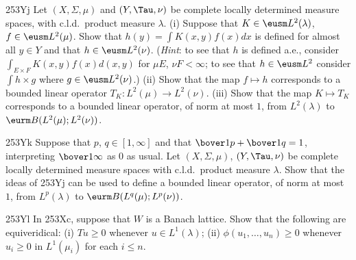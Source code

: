 {\spheader 253Yj Let $(X,\Sigma,\mu)$ and $(Y,\Tau,\nu)$ be complete
locally determined measure spaces, with c.l.d.\ product measure
$\lambda$.   (i) Suppose that $K\in\eusm L^2(\lambda)$,
$f\in\eusm L^2(\mu)$.   Show that $h(y)=\int K(x,y)f(x)dx$ is defined for almost
all $y\in Y$ and that $h\in\eusm L^2(\nu)$.   ({\it Hint\/}:  to see
that $h$ is defined a.e., consider $\int_{E\times F}K(x,y)f(x)d(x,y)$
for $\mu E$, $\nu F<\infty$;  to see that $h\in\eusm L^2$ consider
$\int h\times g$ where $g\in\eusm L^2(\nu)$.)   (ii) Show that the map
$f\mapsto h$ corresponds to a bounded linear operator
$T_K:L^2(\mu)\to L^2(\nu)$.   (iii) Show that the map $K\mapsto T_K$
corresponds to a bounded linear operator, of norm at most $1$, from
$L^2(\lambda)$ to $\eurm B(L^2(\mu);L^2(\nu))$.

\spheader 253Yk Suppose that $p$, $q\in[1,\infty]$ and that
$\bover1p+\bover1q=1$, interpreting $\bover1{\infty}$ as $0$ as usual.
Let $(X,\Sigma,\mu)$, $(Y,\Tau,\nu)$ be complete locally determined
measure spaces with c.l.d.\ product measure $\lambda$.    Show that the
ideas of 253Yj can be used to define a bounded linear operator, of norm
at most $1$, from $L^p(\lambda)$ to $\eurm B(L^q(\mu);L^p(\nu))$.

\spheader 253Yl In 253Xc, suppose that $W$ is a Banach lattice.   Show
that the following are equiveridical:  (i) $Tu\ge 0$ whenever
$u\in L^1(\lambda)$;  (ii) $\phi(u_1,\ldots,u_n)\ge 0$ whenever
$u_i\ge 0$ in $L^1(\mu_i)$ for each $i\le n$.
}%

